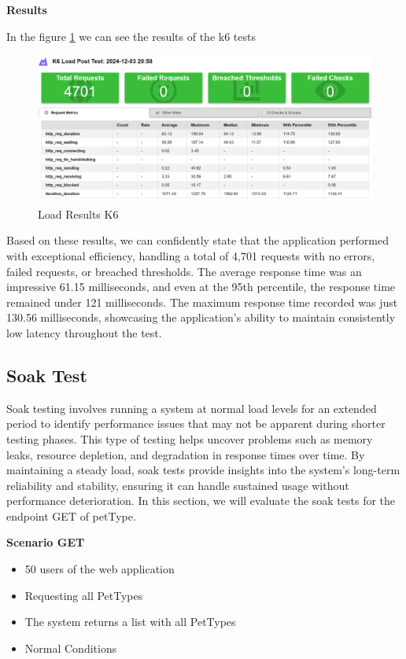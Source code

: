 \documentclass[a4paper,11pt,openright,BCOR=15mm]{scrbook}
\begin{document}
\textbf{Results}

In the figure \ref{fig:LoadResultsK6} we can see the results of the k6 tests

\begin{figure}[H]
	\centering
	\includegraphics[width=\textwidth]{figs/Performance/k6/LoadPostK6Result.png}
	\caption{Load Results K6}
	\label{fig:LoadResultsK6}
\end{figure}

Based on these results, we can confidently state that the application performed with exceptional efficiency, handling a total of 4,701 requests with no errors, failed requests, or breached thresholds. The average response time was an impressive 61.15 milliseconds, and even at the 95th percentile, the response time remained under 121 milliseconds. The maximum response time recorded was just 130.56 milliseconds, showcasing the application's ability to maintain consistently low latency throughout the test.

\subsection{Soak Test}


Soak testing involves running a system at normal load levels for an extended period to identify performance issues that may not be apparent during shorter testing phases. This type of testing helps uncover problems such as memory leaks, resource depletion, and degradation in response times over time. By maintaining a steady load, soak tests provide insights into the system’s long-term reliability and stability, ensuring it can handle sustained usage without performance deterioration. In this section, we will evaluate the soak tests for the endpoint GET of petType.		
		
\textbf{Scenario GET}
\begin{itemize}
	\item 50 users of the web application
	\item Requesting all PetTypes
	\item The system returns a list with all PetTypes
	\item Normal Conditions
\end{itemize}
\end{document}
